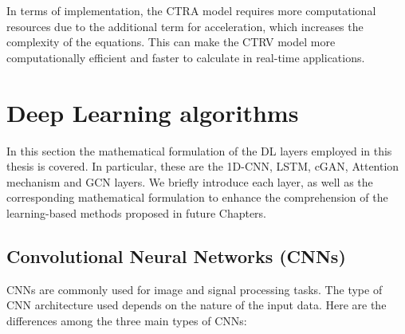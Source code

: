 In terms of implementation, the \ac{CTRA} model requires more computational resources due to the additional term for acceleration, which increases the complexity of the equations. This can make the \ac{CTRV} model more computationally efficient and faster to calculate in real-time applications. 

\section{Deep Learning algorithms}
\label{sec:3_dlb_formulation}

In this section the mathematical formulation of the \ac{DL} layers employed in this thesis is covered. In particular, these are the 1D-\ac{CNN}, \ac{LSTM}, \ac{cGAN}, Attention mechanism and \ac{GCN} layers. We briefly introduce each layer, as well as the corresponding mathematical formulation to enhance the comprehension of the learning-based methods proposed in future Chapters.

\subsection{Convolutional Neural Networks (CNNs)}
\label{subsec:3_cnns}



\acp{CNN} are commonly used for image and signal processing tasks. The type of \ac{CNN} architecture used depends on the nature of the input data. Here are the differences among the three main types of \acp{CNN}:

